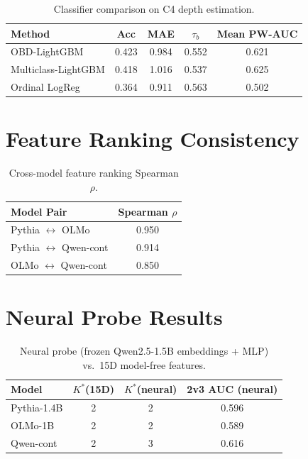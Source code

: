 \documentclass[11pt]{article}
\begin{document}
\begin{table}[h]
\centering
\caption{Classifier comparison on C4 depth estimation.}
\label{tab:classifier}
\small
\begin{tabular}{lcccc}
\toprule
Method & Acc & MAE & $\tau_b$ & Mean PW-AUC \\
\midrule
OBD-LightGBM & 0.423 & 0.984 & 0.552 & 0.621 \\
Multiclass-LightGBM & 0.418 & 1.016 & 0.537 & 0.625 \\
Ordinal LogReg & 0.364 & 0.911 & 0.563 & 0.502 \\
\bottomrule
\end{tabular}
\end{table}

\section{Feature Ranking Consistency}
\label{app:features}

\begin{table}[h]
\centering
\caption{Cross-model feature ranking Spearman $\rho$.}
\label{tab:feature_ranking}
\small
\begin{tabular}{lc}
\toprule
Model Pair & Spearman $\rho$ \\
\midrule
Pythia $\leftrightarrow$ OLMo & 0.950 \\
Pythia $\leftrightarrow$ Qwen-cont & 0.914 \\
OLMo $\leftrightarrow$ Qwen-cont & 0.850 \\
\bottomrule
\end{tabular}
\end{table}

\section{Neural Probe Results}

\begin{table}[h]
\centering
\caption{Neural probe (frozen Qwen2.5-1.5B embeddings + MLP) vs.\ 15D model-free features.}
\label{tab:neural}
\small
\begin{tabular}{lccc}
\toprule
Model & $K^*$(15D) & $K^*$(neural) & 2v3 AUC (neural) \\
\midrule
Pythia-1.4B & 2 & 2 & 0.596 \\
OLMo-1B & 2 & 2 & 0.589 \\
Qwen-cont & 2 & 3 & 0.616 \\
\bottomrule
\end{tabular}
\end{table}
\end{document}
